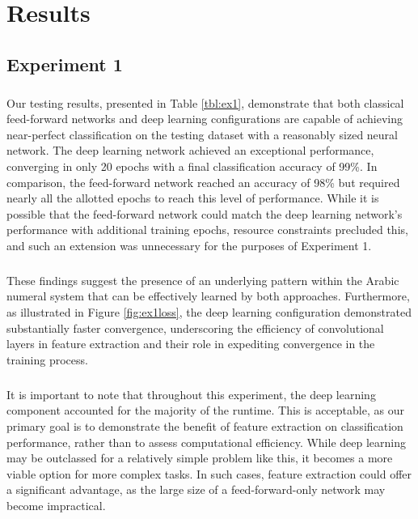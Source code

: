 \chapter{Results}
\section{Experiment 1}
\paragraph{}
Our testing results, presented in Table \ref{tbl:ex1}, demonstrate that both classical feed-forward networks and deep learning configurations are capable of achieving near-perfect classification on the testing dataset with a reasonably sized neural network. The deep learning network achieved an exceptional performance, converging in only 20 epochs with a final classification accuracy of 99\%. In comparison, the feed-forward network reached an accuracy of 98\%  but required nearly all the allotted epochs to reach this level of performance. While it is possible that the feed-forward network could match the deep learning network's performance with additional training epochs, resource constraints precluded this, and such an extension was unnecessary for the purposes of Experiment 1.
\paragraph{}
These findings suggest the presence of an underlying pattern within the Arabic numeral system that can be effectively learned by both approaches. Furthermore, as illustrated in Figure \ref{fig:ex1loss}, the deep learning configuration demonstrated substantially faster convergence, underscoring the efficiency of convolutional layers in feature extraction and their role in expediting convergence in the training process.
\paragraph{}
It is important to note that throughout this experiment, the deep learning component accounted for the majority of the runtime. This is acceptable, as our primary goal is to demonstrate the benefit of feature extraction on classification performance, rather than to assess computational efficiency. While deep learning may be outclassed for a relatively simple problem like this, it becomes a more viable option for more complex tasks. In such cases, feature extraction could offer a significant advantage, as the large size of a feed-forward-only network may become impractical.


